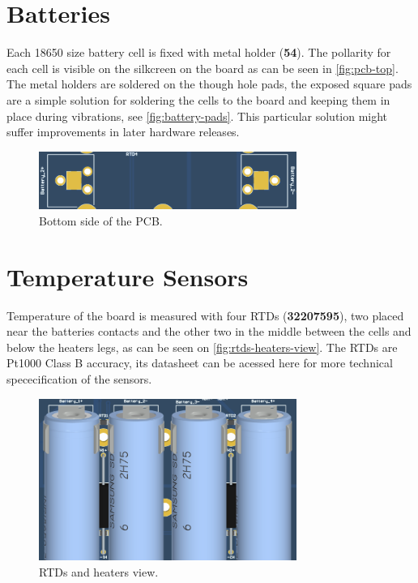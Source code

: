 \section{Batteries}

Each 18650 size battery cell is fixed with metal holder (\textbf{54}). The pollarity for each cell is visible on the silkcreen on the board as can be seen in \autoref{fig:pcb-top}. The metal holders are soldered on the though hole pads, the exposed square pads are a simple solution for soldering the cells to the board and keeping them in place during vibrations, see \autoref{fig:battery-pads}. This particular solution might suffer improvements in later hardware releases.

\begin{figure}[!ht]
    \begin{center}
        \includegraphics[width=0.75\textwidth]{figures/battery-pads.png}
        \caption{Bottom side of the PCB.}
        \label{fig:battery-pads}
    \end{center}
\end{figure}

\section{Temperature Sensors}

Temperature of the board is measured with four RTDs (\textbf{32207595}), two placed near the batteries contacts and the other two in the middle between the cells and below the heaters legs, as can be seen on \autoref{fig:rtds-heaters-view}. The RTDs are Pt1000 Class B accuracy, its datasheet can be acessed here \cite{rtd-datasheet} for more technical spececification of the sensors.

\begin{figure}[!ht]
    \begin{center}
        \includegraphics[width=0.75\textwidth]{figures/rtds-heaters-view.png}
        \caption{RTDs and heaters view.}
        \label{fig:rtds-heaters-view}
    \end{center}
\end{figure}

